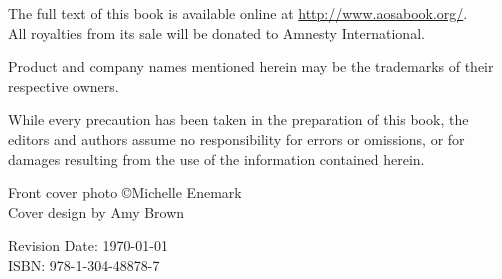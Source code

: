 \vspace{0.15cm}

\noindent
The full text of this book is available online at \url{http://www.aosabook.org/}.\\
All royalties from its sale will be donated to Amnesty International.\\


\vfill

\noindent Product and company names mentioned herein may be the trademarks of
their respective owners.\\

\vspace{0.15cm}

\noindent While every precaution has been taken in the preparation of this
book, the editors and authors assume no responsibility for errors or omissions,
or for damages resulting from the use of the information contained herein.\\

\vspace{0.15cm}

\noindent Front cover photo \copyright Michelle Enemark \\
\noindent Cover design by Amy Brown

\vspace{1cm}

\noindent Revision Date: \today \\

\noindent ISBN: 978-1-304-48878-7
\normalsize

\newpage






